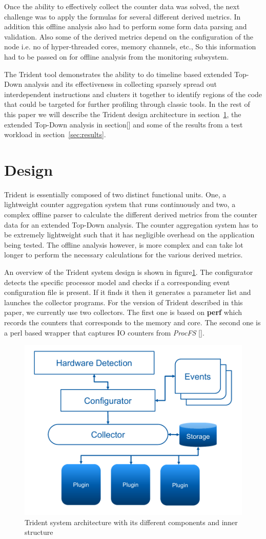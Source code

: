 \documentclass{webofc}
\begin{document}
Once the ability to effectively collect the counter data was solved, the next challenge was to apply the formulas for several different derived metrics. In addition this offline analysis also had to perform some form data parsing and validation. Also some of the derived metrics depend on the configuration of the node i.e. no of hyper-threaded cores, memory channels, etc., So this information had to be passed on for offline analysis from the monitoring subsystem. 

The Trident tool demonstrates the ability to do timeline based extended Top-Down analysis and its effectiveness in collecting sparsely spread out interdependent instructions and clusters it together to identify regions of the code that could be targeted for further profiling through classic tools. In the rest of this paper we will describe the Trident design architecture in section~\ref{sec:design}, the extended Top-Down analysis in section[] and some of the results from a test workload in section~\ref{sec:results}.


\section{Design}
\label{sec:design}

Trident is essentially composed of two distinct functional units. One, a lightweight counter aggregation system that runs continuously and two, a complex offline parser to calculate the different derived metrics from the counter data for an extended Top-Down analysis. The counter aggregation system has to be extremely lightweight such that it has negligible overhead on the application being tested. The offline analysis however, is more complex and can take lot longer to perform the necessary calculations for the various derived metrics. 

An overview of the Trident system design is shown in figure\ref{fig:design}. The configurator detects the specific processor model and checks if a corresponding event configuration file is present. If it finds it then it generates a parameter list and launches the collector programs. For the version of Trident described in this paper, we currently use two collectors. The first one is based on \textbf{perf} which records the counters that corresponds to the memory and core. The second one is a perl based wrapper that captures IO counters from \textit{ProcFS} []. 

\begin{figure}
  \centering
	\captionsetup{justification=centering}
  \includegraphics[width=0.5\linewidth]{Design.pdf}
\caption{Trident system architecture with its different components and inner structure}
\label{fig:design}
\end{figure}
\end{document}
